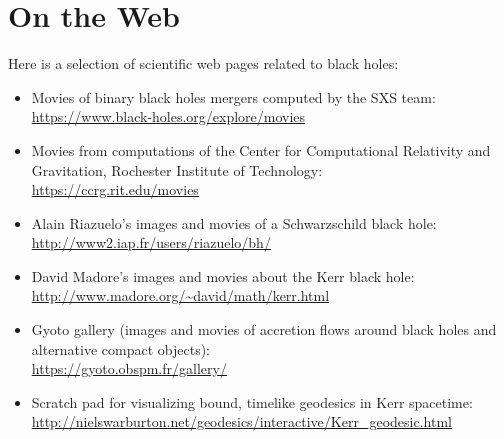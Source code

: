 \chapter{On the Web} \label{s:web}

\minitoc

Here is a selection of scientific web pages related to black holes:

\begin{itemize}
\item Movies of binary black holes mergers computed by the SXS team:\\
\url{https://www.black-holes.org/explore/movies}
\item Movies from computations of the Center for Computational Relativity
and Gravitation, Rochester Institute of Technology:\\
\url{https://ccrg.rit.edu/movies}
\item Alain Riazuelo's images and movies of a Schwarzschild black hole:\\
\url{http://www2.iap.fr/users/riazuelo/bh/}
\item David Madore's images and movies about the Kerr black hole:\\
\url{http://www.madore.org/~david/math/kerr.html}
\item Gyoto gallery (images and movies of accretion flows around black holes and alternative
compact objects): \\
\url{https://gyoto.obspm.fr/gallery/}
\item Scratch pad for visualizing bound, timelike geodesics in Kerr spacetime:\\
\url{http://nielswarburton.net/geodesics/interactive/Kerr_geodesic.html}
\end{itemize}

